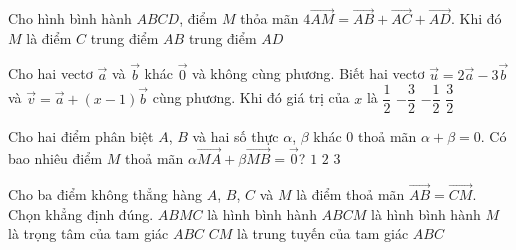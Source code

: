 \begin{ex}%
	Cho hình bình hành $ABCD$, điểm $M$ thỏa mãn $4\overrightarrow{AM}=\overrightarrow{AB}+\overrightarrow{AC}+\overrightarrow{AD}$. Khi đó $M$ là
	{điểm $C$}
	{trung điểm $AB$}
	{trung điểm $AD$}
\end{ex}

\begin{ex}%
	Cho hai vectơ $\overrightarrow{a}$ và $\overrightarrow{b}$ khác $\overrightarrow{0}$ và không cùng phương. Biết hai vectơ $\overrightarrow{u} = 2\overrightarrow{a} - 3\overrightarrow{b}$ và $\overrightarrow{v}= \overrightarrow{a} + (x - 1)\overrightarrow{b}$ cùng phương. Khi đó giá trị của $x$ là
	\choice
	{$\dfrac{1}{2}$}
	{$-\dfrac{3}{2}$}
	{\True $-\dfrac{1}{2}$}
	{$\dfrac{3}{2}$}
\end{ex}

\begin{ex}%
	Cho hai điểm phân biệt $A$, $B$ và hai số thực $\alpha$, $\beta$ khác $0$ thoả mãn $\alpha+\beta= 0$. Có bao nhiêu điểm $M$ thoả mãn $\alpha \overrightarrow{MA}+\beta \overrightarrow{MB}=\overrightarrow{0}$?
	{$1$}
	{$2$}
	{$3$}
\end{ex}

\begin{ex}%
	Cho ba điểm không thẳng hàng $A$, $B$, $C$ và $M$ là điểm thoả mãn $\overrightarrow{AB}=\overrightarrow{CM}$. Chọn khẳng định đúng.
	\choice
	{\True $ABMC$ là hình bình hành}
	{$ABCM$ là hình bình hành}
	{$M$ là trọng tâm của tam giác $ABC$}
	{$CM$ là trung tuyến của tam giác $ABC$}
\end{ex}

